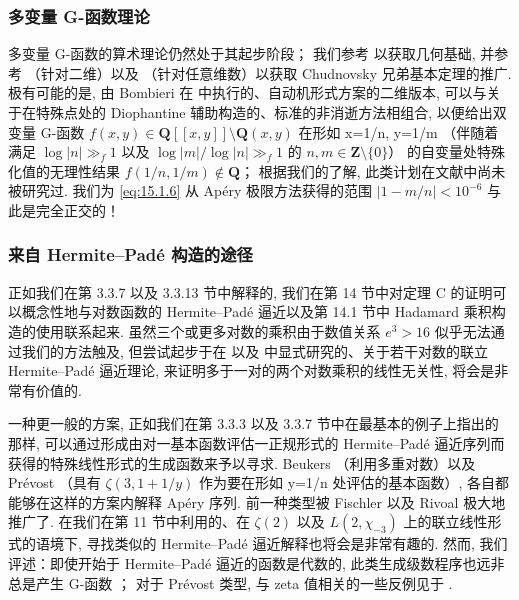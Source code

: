 \subsubsection{多变量 G-函数理论}\label{sec:15.1.9}

多变量 G-函数的算术理论仍然处于其起步阶段； 
我们参考 \cite{AB97} 以获取几何基础, 
并参考 \cite{Nag97}（针对二维）以及 \cite{DV01}（针对任意维数）以获取 Chudnovsky 兄弟基本定理的推广. 
极有可能的是, 由 Bombieri 在 \cite{Bom81} 中执行的、自动机形式方案的二维版本, 
可以与关于在特殊点处的 Diophantine 辅助构造的、标准的非消逝方法相组合, 
以便给出双变量 G-函数 \(f(x,y) \in \mathbf{Q}[\![x,y]\!] \setminus \mathbf{Q}(x,y)\) 在形如 x=1/n, y=1/m 
（伴随着满足 \(\log |n| \gg_f 1\) 以及 \(\log |m|/\log |n| \gg_f 1\) 的 \(n,m \in \mathbf{Z} \setminus \{0\}\)） 
的自变量处特殊化值的无理性结果 \(f(1/n,1/m) \notin \mathbf{Q}\)； 
根据我们的了解, 此类计划在文献中尚未被研究过. 
我们为 \eqref{eq:15.1.6} 从 Ap{\'e}ry 极限方法获得的范围 \(|1-m/n| < 10^{-6}\) 与此是完全正交的！

\subsubsection{来自 Hermite--Pad{\'e} 构造的途径}\label{sec:15.1.10}

正如我们在第 3.3.7 以及 3.3.13 节中解释的, 
我们在第 14 节中对定理 C 的证明可以概念性地与对数函数的 Hermite--Pad{\'e} 逼近以及第 14.1 节中 Hadamard 乘积构造的使用联系起来. 
虽然三个或更多对数的乘积由于数值关系 \(e^3 > 16\) 似乎无法通过我们的方法触及, 
但尝试起步于在 \cite{RT86} 以及 \cite{DHKK22} 中显式研究的、关于若干对数的联立 Hermite--Pad{\'e} 逼近理论, 
来证明多于一对的两个对数乘积的线性无关性, 将会是非常有价值的.

一种更一般的方案, 正如我们在第 3.3.3 以及 3.3.7 节中在最基本的例子上指出的那样, 
可以通过形成由对一基本函数评估一正规形式的 Hermite--Pad{\'e} 逼近序列而获得的特殊线性形式的生成函数来予以寻求. 
Beukers \cite{Beu81}\cite{Beu84} （利用多重对数）以及 Pr{\'e}vost \cite{Pre96} （具有 \(\zeta(3, 1+1/y)\) 作为要在形如 y=1/n 处评估的基本函数）, 
各自都能够在这样的方案内解释 Ap{\'e}ry 序列. 
前一种类型被 Fischler 以及 Rivoal \cite{FR03} 极大地推广了. 
在我们在第 11 节中利用的、在 \(\zeta(2)\) 以及 \(L(2,\chi_{-3})\) 上的联立线性形式的语境下, 
寻找类似的 Hermite--Pad{\'e} 逼近解释也将会是非常有趣的. 
然而, 我们评述：即使开始于 Hermite--Pad{\'e} 逼近的函数是代数的, 
此类生成级数程序也远非总是产生 G-函数 \cite{BC97b}； 
对于 Pr{\'e}vost 类型, 与 zeta 值相关的一些反例见于 \cite[第 8 节]{PR21}.

